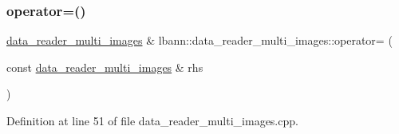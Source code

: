 \subsubsection{\texorpdfstring{operator=()}{operator=()}}
{\footnotesize\ttfamily \hyperlink{classlbann_1_1data__reader__multi__images}{data\+\_\+reader\+\_\+multi\+\_\+images} \& lbann\+::data\+\_\+reader\+\_\+multi\+\_\+images\+::operator= (\begin{DoxyParamCaption}\item[{const \hyperlink{classlbann_1_1data__reader__multi__images}{data\+\_\+reader\+\_\+multi\+\_\+images} \&}]{rhs }\end{DoxyParamCaption})}



Definition at line 51 of file data\+\_\+reader\+\_\+multi\+\_\+images.\+cpp.


